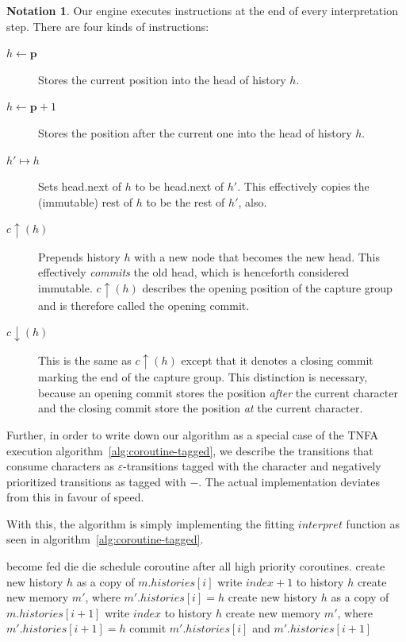 \documentclass[11pt,a4paper,twoside,openright]{Thesis}
\theoremstyle{definition}
\newtheorem*{notation}{Notation}
\newcommand{\pos}{\mathbf{\mathbf{p}}}
\begin{document}
\begin{notation}
Our engine executes instructions at the end of every interpretation
step. There are four kinds of instructions:

\begin{description}
\item [$h\leftarrow\pos$] Stores the current position into the head of history $h$.
\item [$h\leftarrow\pos+1$] Stores the position after the current one into the
  head of history $h$.
\item [$h'\mapsto h$] Sets head.next of $h$ to be head.next of $h'$. 
	This effectively copies the (immutable) rest of $h$ to be the rest of $h'$, also. 
\item [$c\uparrow(h)$] Prepends history $h$ with a new node that becomes the
  new head.  This effectively \emph{commits} the old head, which is henceforth
  considered immutable. $c\uparrow(h)$ describes the opening position of the
  capture group and is therefore called the opening commit. 
\item [$c\downarrow(h)$] This is the same as $c\uparrow(h)$ except that it
  denotes a closing commit marking the end of the capture group.  This
  distinction is necessary, because an opening commit stores the position
  \emph{after} the current character and the closing commit store the
  position \emph{at} the current character.
\end{description}
\end{notation}

Further, in order to write down our algorithm as a special case of the TNFA 
execution algorithm~\ref{alg:coroutine-tagged}, we describe the transitions 
that consume characters as $\varepsilon$-transitions tagged with the 
character and negatively prioritized transitions as tagged with $-$. The 
actual implementation deviates from this in favour of speed.

With this, the algorithm is simply implementing the fitting $interpret$ 
function as seen in algorithm~\ref{alg:coroutine-tagged}.

\begin{algorithm*}[htbp]
\begin{algorithmic}[1]
      \State become fed
      \Else
        \State die
      \EndIf
    \EndIf
        \State die
      \EndIf
    \EndIf
      \State schedule coroutine after all high priority coroutines.
    \EndIf
      \State create new history $h$ as a copy of $m.histories[i]$
      \State write $index+1$ to history $h$
      \State create new memory $m'$, where $m'.histories[i] = h$
    \EndIf
      \State create new history $h$ as a copy of $m.histories[i+1]$
      \State write $index$ to history $h$
      \State create new memory $m'$, where $m'.histories[i+1] = h$
      \State commit $m'.histories[i]$ and $m'.histories[i+1]$
    \EndIf
  \EndFunction
\end{algorithmic}
\label{alg:interpret}
\end{algorithm*}
\end{document}
